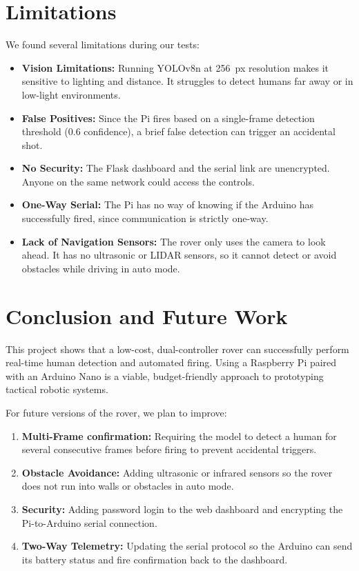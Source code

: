 \documentclass[conference]{IEEEtran}
\begin{document}
\section{Limitations}
We found several limitations during our tests:
\begin{itemize}
    \item \textbf{Vision Limitations:} Running YOLOv8n at 256~px resolution makes it sensitive to lighting and distance. It struggles to detect humans far away or in low-light environments.
    \item \textbf{False Positives:} Since the Pi fires based on a single-frame detection threshold (0.6 confidence), a brief false detection can trigger an accidental shot.
    \item \textbf{No Security:} The Flask dashboard and the serial link are unencrypted. Anyone on the same network could access the controls.
    \item \textbf{One-Way Serial:} The Pi has no way of knowing if the Arduino has successfully fired, since communication is strictly one-way.
    \item \textbf{Lack of Navigation Sensors:} The rover only uses the camera to look ahead. It has no ultrasonic or LIDAR sensors, so it cannot detect or avoid obstacles while driving in auto mode.
\end{itemize}

\section{Conclusion and Future Work}
This project shows that a low-cost, dual-controller rover can successfully perform real-time human detection and automated firing. Using a Raspberry Pi paired with an Arduino Nano is a viable, budget-friendly approach to prototyping tactical robotic systems.

For future versions of the rover, we plan to improve:
\begin{enumerate}
    \item \textbf{Multi-Frame confirmation:} Requiring the model to detect a human for several consecutive frames before firing to prevent accidental triggers.
    \item \textbf{Obstacle Avoidance:} Adding ultrasonic or infrared sensors so the rover does not run into walls or obstacles in auto mode.
    \item \textbf{Security:} Adding password login to the web dashboard and encrypting the Pi-to-Arduino serial connection.
    \item \textbf{Two-Way Telemetry:} Updating the serial protocol so the Arduino can send its battery status and fire confirmation back to the dashboard.
\end{enumerate}
\end{document}
